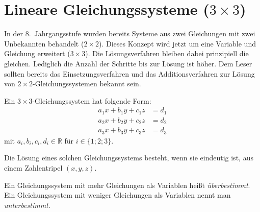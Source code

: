 \section{Lineare Gleichungssysteme (\ensuremath{3\times 3})}

In der 8.~Jahrgangsstufe wurden bereits Systeme aus zwei Gleichungen mit zwei Unbekannten behandelt (\(2\times2\)). Dieses Konzept wird jetzt um eine Variable und Gleichung erweitert (\(3\times 3\)).
Die Lösungsverfahren bleiben dabei prinzipiell die gleichen. Lediglich die Anzahl der Schritte bis zur Lösung ist höher. Dem Leser sollten bereits das Einsetzungsverfahren und das Additionsverfahren zur Lösung von \(2\times 2\)-Gleichungssystemen bekannt sein.

Ein \(3\times 3\)-Gleichungssystem hat folgende Form:
\begin{align*}
 a_1 x + b_1 y + c_1 z &= d_1 \\
 a_2 x + b_2 y + c_2 z &= d_2 \\
 a_3 x + b_3 y + c_3 z &= d_3
\end{align*}
mit \(a_i, b_i, c_i, d_i \in\mathbb{R}\) für \(i\in\lbrace 1;2;3\rbrace\).

Die Lösung eines solchen Gleichungssystems besteht, wenn sie eindeutig ist, aus einem Zahlentripel \((x,y,z)\).

\begin{defi}
 Ein Gleichungssystem mit mehr Gleichungen als Variablen heißt \emph{überbestimmt}. Ein Gleichungssystem mit weniger Gleichungen als Variablen nennt man \emph{unterbestimmt}.
\end{defi}

\begin{regel}[Einsetzungsverfahren]
 
\end{regel}


